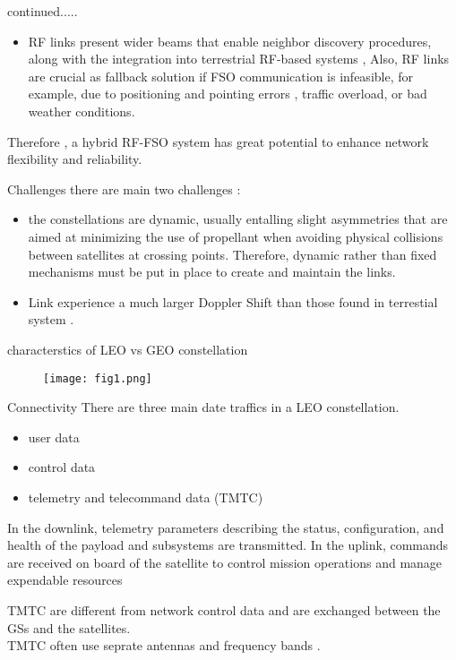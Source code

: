 \documentclass{beamer}
\begin{document}
\begin{frame}
\begin{block}{continued.....}
\begin{itemize}
 
     \item RF links present wider beams that enable
neighbor discovery procedures, along with the integration
into terrestrial RF-based systems , 
Also, RF links are crucial as
fallback solution if FSO communication is infeasible, for
example, due to positioning and pointing errors 
, traffic overload, or bad weather conditions.
\end{itemize}
Therefore , a hybrid RF-FSO system has great potential to enhance
network flexibility and reliability.
\end{block}
\begin{block}{Challenges}
there are main two challenges :
\begin{itemize}
    \item the constellations are dynamic, usually entalling slight asymmetries that are aimed
at minimizing the use of propellant when avoiding physical
collisions between satellites at crossing points. Therefore,
dynamic rather than fixed mechanisms must be put in place to
create and maintain the links.
\item Link experience a much larger Doppler Shift than those found in terrestial system .
\end{itemize}
\end{block}    
\end{frame}

\begin{frame}{characterstics of LEO vs GEO constellation}
\begin{figure}
    \centering
    \texttt{[image: fig1.png]}
    \label{fig:1}
\end{figure}
\end{frame}

\begin{frame}
\begin{block}{Connectivity}
    There are three main date traffics in a LEO constellation.
    \begin{itemize}
        \item user data
        \item control data
        \item telemetry and telecommand data (TMTC)
    \end{itemize}In the downlink, telemetry parameters describing
the status, configuration, and health of the payload and
subsystems are transmitted. In the uplink, commands are
received on board of the satellite to control mission operations
and manage expendable resources
    
TMTC are different from network control data and are exchanged between the GSs and the satellites.\\TMTC often use seprate antennas    and frequency bands .
\end{block}
\end{frame}
\end{document}
